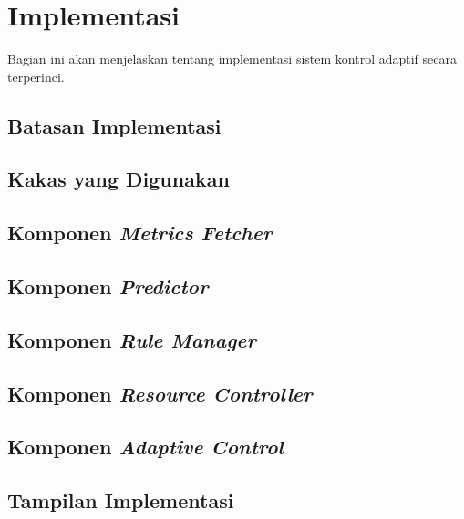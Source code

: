 \section{Implementasi}

Bagian ini akan menjelaskan tentang implementasi sistem kontrol adaptif secara terperinci.

\subsection{Batasan Implementasi}
\blindtext

\subsection{Kakas yang Digunakan}
\blindtext

\subsection{Komponen \textit{Metrics Fetcher}}
\blindtext

\subsection{Komponen \textit{Predictor}}
\blindtext

\subsection{Komponen \textit{Rule Manager}}
\blindtext

\subsection{Komponen \textit{Resource Controller}}
\blindtext

\subsection{Komponen \textit{Adaptive Control}}
\blindtext

\subsection{Tampilan Implementasi}
\blindtext